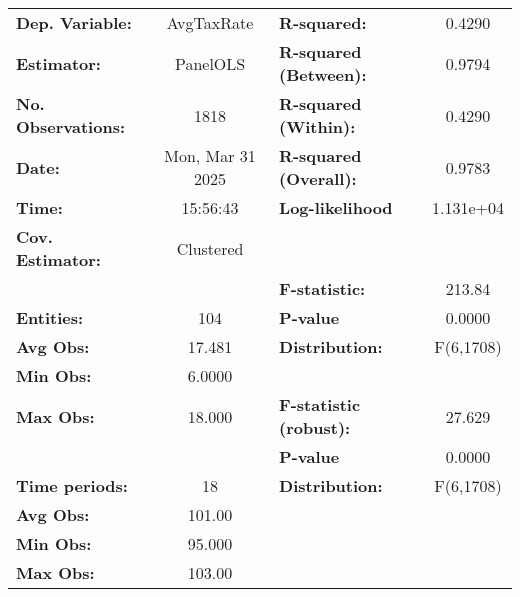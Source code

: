 \begin{center}
\begin{tabular}{lclc}
\toprule
\textbf{Dep. Variable:}              &     AvgTaxRate     & \textbf{  R-squared:         }   &      0.4290      \\
\textbf{Estimator:}                  &      PanelOLS      & \textbf{  R-squared (Between):}  &      0.9794      \\
\textbf{No. Observations:}           &        1818        & \textbf{  R-squared (Within):}   &      0.4290      \\
\textbf{Date:}                       &  Mon, Mar 31 2025  & \textbf{  R-squared (Overall):}  &      0.9783      \\
\textbf{Time:}                       &      15:56:43      & \textbf{  Log-likelihood     }   &    1.131e+04     \\
\textbf{Cov. Estimator:}             &     Clustered      & \textbf{                     }   &                  \\
\textbf{}                            &                    & \textbf{  F-statistic:       }   &      213.84      \\
\textbf{Entities:}                   &        104         & \textbf{  P-value            }   &      0.0000      \\
\textbf{Avg Obs:}                    &       17.481       & \textbf{  Distribution:      }   &    F(6,1708)     \\
\textbf{Min Obs:}                    &       6.0000       & \textbf{                     }   &                  \\
\textbf{Max Obs:}                    &       18.000       & \textbf{  F-statistic (robust):} &      27.629      \\
\textbf{}                            &                    & \textbf{  P-value            }   &      0.0000      \\
\textbf{Time periods:}               &         18         & \textbf{  Distribution:      }   &    F(6,1708)     \\
\textbf{Avg Obs:}                    &       101.00       & \textbf{                     }   &                  \\
\textbf{Min Obs:}                    &       95.000       & \textbf{                     }   &                  \\
\textbf{Max Obs:}                    &       103.00       & \textbf{                     }   &                  \\

\end{tabular}
\end{center}

